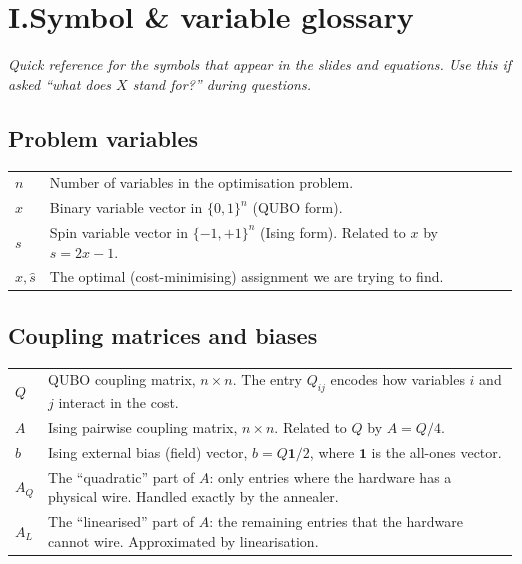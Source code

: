 \documentclass[11pt,a4paper]{article}
\begin{document}
\section*{I.\quad Symbol \& variable glossary}

\noindent\textit{Quick reference for the symbols that appear in the slides and equations. Use this if asked ``what does $X$ stand for?'' during questions.}

\subsection*{\small\color{accent} Problem variables}
\begin{tabular}{@{}p{2.4cm}p{14cm}@{}}
$n$            & Number of variables in the optimisation problem. \\
$x$            & Binary variable vector in $\{0,1\}^n$ (QUBO form). \\
$s$            & Spin variable vector in $\{-1,+1\}^n$ (Ising form). Related to $x$ by $s = 2x - 1$. \\
$\hat{x}, \hat{s}$ & The optimal (cost-minimising) assignment we are trying to find. \\
\end{tabular}

\subsection*{\small\color{accent} Coupling matrices and biases}
\begin{tabular}{@{}p{2.4cm}p{14cm}@{}}
$Q$            & QUBO coupling matrix, $n \times n$. The entry $Q_{ij}$ encodes how variables $i$ and $j$ interact in the cost. \\
$A$            & Ising pairwise coupling matrix, $n \times n$. Related to $Q$ by $A = Q/4$. \\
$b$            & Ising external bias (field) vector, $b = Q \mathbf{1} / 2$, where $\mathbf{1}$ is the all-ones vector. \\
$A_Q$          & The ``quadratic'' part of $A$: only entries where the hardware has a physical wire. Handled exactly by the annealer. \\
$A_L$          & The ``linearised'' part of $A$: the remaining entries that the hardware cannot wire. Approximated by linearisation. \\
\end{tabular}
\end{document}
